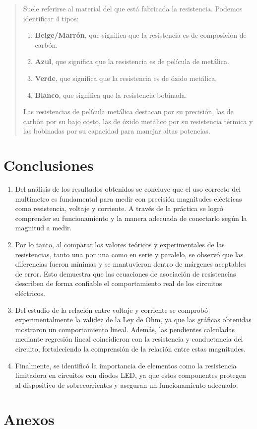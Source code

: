\documentclass{article}
\begin{document}
\begin{itemize}
        \begin{quote}
            Suele referirse al material del que está fabricada la resistencia. Podemos identificar 4 tipos:
            \begin{enumerate}
                \item \textbf{Beige/Marrón}, que significa que la resistencia es de composición de carbón.
                \item \textbf{Azul}, que significa que la resistencia es de película de metálica.
                \item \textbf{Verde}, que significa que la resistencia es de óxido metálica.
                \item \textbf{Blanco}, que significa que la resistencia bobinada.
            \end{enumerate}
            Las resistencias de película metálica destacan por su precisión, las de carbón por su bajo costo, las de óxido metálico por su resistencia térmica y las bobinadas por su capacidad para manejar altas potencias.
        \end{quote}
    \end{itemize}

    \section{Conclusiones}

    \begin{enumerate}
        \item Del análisis de los resultados obtenidos se concluye que el uso correcto del multímetro es fundamental para medir con precisión magnitudes eléctricas como resistencia, voltaje y corriente. A través de la práctica se logró comprender su funcionamiento y la manera adecuada de conectarlo según la magnitud a medir.
        \item Por lo tanto, al comparar los valores teóricos y experimentales de las resistencias, tanto una por una como en serie y paralelo, se observó que las diferencias fueron mínimas y se mantuvieron dentro de márgenes aceptables de error. Esto demuestra que las ecuaciones de asociación de resistencias describen de forma confiable el comportamiento real de los circuitos eléctricos.
        \item Del estudio de la relación entre voltaje y corriente se comprobó experimentalmente la validez de la Ley de Ohm, ya que las gráficas obtenidas mostraron un comportamiento lineal. Además, las pendientes calculadas mediante regresión lineal coincidieron con la resistencia y conductancia del circuito, fortaleciendo la comprensión de la relación entre estas magnitudes.
        \item Finalmente, se identificó la importancia de elementos como la resistencia limitadora en circuitos con diodos LED, ya que estos componentes protegen al dispositivo de sobrecorrientes y aseguran un funcionamiento adecuado.
    \end{enumerate}

    \nocite{*}
    \printbibliography{}

    \section{Anexos}

\end{document}
